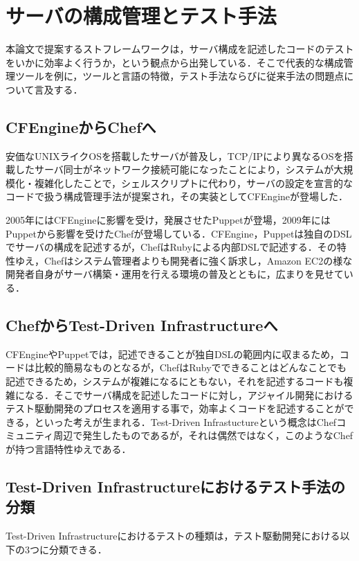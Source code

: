 \section{サーバの構成管理とテスト手法}

本論文で提案するストフレームワークは，サーバ構成を記述したコードのテストをいかに効率よく行うか，という観点から出発している．そこで代表的な構成管理ツールを例に，ツールと言語の特徴，テスト手法ならびに従来手法の問題点について言及する．

\subsection{CFEngineからChefへ}

安価なUNIXライクOSを搭載したサーバが普及し，TCP/IPにより異なるOSを搭載したサーバ同士がネットワーク接続可能になったことにより，システムが大規模化・複雑化したことで，シェルスクリプトに代わり，サーバの設定を宣言的なコードで扱う構成管理手法が提案され，その実装としてCFEngine\cite{cfengine}が登場した．

2005年にはCFEngineに影響を受け，発展させたPuppet\cite{puppet}が登場，2009年にはPuppetから影響を受けたChef\cite{chef}が登場している．CFEngine，Puppetは独自のDSLでサーバの構成を記述するが，ChefはRubyによる内部DSLで記述する．その特性ゆえ，Chefはシステム管理者よりも開発者に強く訴求し，Amazon EC2の様な開発者自身がサーバ構築・運用を行える環境の普及とともに，広まりを見せている．

\subsection{ChefからTest-Driven Infrastructureへ}

CFEngineやPuppetでは，記述できることが独自DSLの範囲内に収まるため，コードは比較的簡易なものとなるが，ChefはRubyでできることはどんなことでも記述できるため，システムが複雑になるにともない，それを記述するコードも複雑になる．そこでサーバ構成を記述したコードに対し，アジャイル開発におけるテスト駆動開発のプロセスを適用する事で，効率よくコードを記述することができる，といった考えが生まれる．Test-Driven Infrastuctureという概念はChefコミュニティ周辺で発生したものであるが，それは偶然ではなく，このようなChefが持つ言語特性ゆえである．

\subsection{Test-Driven Infrastructureにおけるテスト手法の分類}

Test-Driven Infrastructureにおけるテストの種類は，テスト駆動開発における以下の3つに分類できる．

